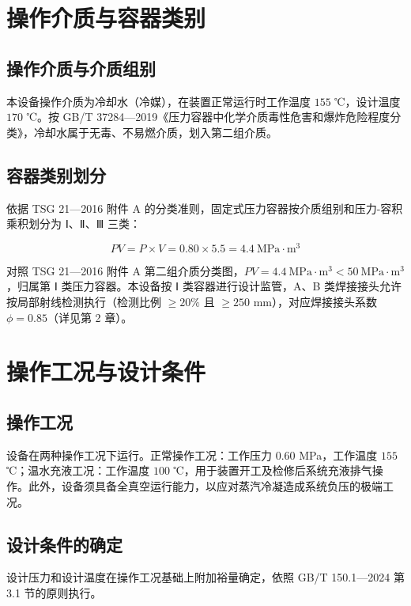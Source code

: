 \section{操作介质与容器类别}

\subsection{操作介质与介质组别}

本设备操作介质为冷却水（冷媒），在装置正常运行时工作温度 $155$ ℃，设计温度 $170$ ℃。按 GB/T 37284—2019《压力容器中化学介质毒性危害和爆炸危险程度分类》\cite{gbt37284-2019}，冷却水属于无毒、不易燃介质，划入第二组介质\cite{tsg21-2016}。

\subsection{容器类别划分}
\label{sec:container-class}

依据 TSG 21—2016 附件 A 的分类准则，固定式压力容器按介质组别和压力-容积乘积划分为 Ⅰ、Ⅱ、Ⅲ 三类：


$$ PV = P \times V = 0.80 \times 5.5 = 4.4\ \text{MPa}\cdot\text{m}^3 $$


对照 TSG 21—2016 附件 A 第二组介质分类图，$PV = 4.4\ \text{MPa}\cdot\text{m}^3 < 50\ \text{MPa}\cdot\text{m}^3$，归属第 Ⅰ 类压力容器。本设备按 Ⅰ 类容器进行设计监管，A、B 类焊接接头允许按局部射线检测执行（检测比例 $\ge 20\%$ 且 $\ge 250$ mm），对应焊接接头系数 $\phi = 0.85$（详见第 2 章）。

\section{操作工况与设计条件}

\subsection{操作工况}

设备在两种操作工况下运行。正常操作工况：工作压力 $0.60$ MPa，工作温度 $155$ ℃；温水充液工况：工作温度 $100$ ℃，用于装置开工及检修后系统充液排气操作。此外，设备须具备全真空运行能力，以应对蒸汽冷凝造成系统负压的极端工况。

\subsection{设计条件的确定}

设计压力和设计温度在操作工况基础上附加裕量确定，依照 GB/T 150.1—2024 第 3.1 节的原则执行\cite{gbt150-2024}。

